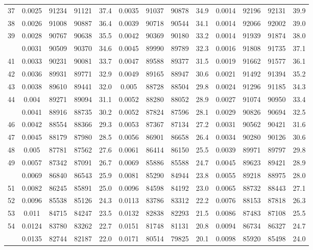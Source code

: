 \documentclass[
  14pt,
]{article}
\begin{document}
\begin{longtable}[t]{lcccccccccccc}
37 & 0.0025 & 91234 & 91121 & 37.4 & 0.0035 & 91037 & 90878 & 34.9 & 0.0014 & 92196 & 92131 & 39.9\\
38 & 0.0026 & 91008 & 90887 & 36.4 & 0.0039 & 90718 & 90544 & 34.1 & 0.0014 & 92066 & 92002 & 39.0\\
39 & 0.0028 & 90767 & 90638 & 35.5 & 0.0042 & 90369 & 90180 & 33.2 & 0.0014 & 91939 & 91874 & 38.0\\
\addlinespace
40 & 0.0031 & 90509 & 90370 & 34.6 & 0.0045 & 89990 & 89789 & 32.3 & 0.0016 & 91808 & 91735 & 37.1\\
41 & 0.0033 & 90231 & 90081 & 33.7 & 0.0047 & 89588 & 89377 & 31.5 & 0.0019 & 91662 & 91577 & 36.1\\
42 & 0.0036 & 89931 & 89771 & 32.9 & 0.0049 & 89165 & 88947 & 30.6 & 0.0021 & 91492 & 91394 & 35.2\\
43 & 0.0038 & 89610 & 89441 & 32.0 & 0.005 & 88728 & 88504 & 29.8 & 0.0024 & 91296 & 91185 & 34.3\\
44 & 0.004 & 89271 & 89094 & 31.1 & 0.0052 & 88280 & 88052 & 28.9 & 0.0027 & 91074 & 90950 & 33.4\\
\addlinespace
45 & 0.0041 & 88916 & 88735 & 30.2 & 0.0052 & 87824 & 87596 & 28.1 & 0.0029 & 90826 & 90694 & 32.5\\
46 & 0.0042 & 88554 & 88366 & 29.3 & 0.0053 & 87367 & 87134 & 27.2 & 0.0031 & 90562 & 90421 & 31.6\\
47 & 0.0045 & 88179 & 87980 & 28.5 & 0.0056 & 86901 & 86658 & 26.4 & 0.0034 & 90280 & 90126 & 30.6\\
48 & 0.005 & 87781 & 87562 & 27.6 & 0.0061 & 86414 & 86150 & 25.5 & 0.0039 & 89971 & 89797 & 29.8\\
49 & 0.0057 & 87342 & 87091 & 26.7 & 0.0069 & 85886 & 85588 & 24.7 & 0.0045 & 89623 & 89421 & 28.9\\
\addlinespace
50 & 0.0069 & 86840 & 86543 & 25.9 & 0.0081 & 85290 & 84944 & 23.8 & 0.0055 & 89218 & 88975 & 28.0\\
51 & 0.0082 & 86245 & 85891 & 25.0 & 0.0096 & 84598 & 84192 & 23.0 & 0.0065 & 88732 & 88443 & 27.1\\
52 & 0.0096 & 85538 & 85126 & 24.3 & 0.0113 & 83786 & 83312 & 22.2 & 0.0076 & 88153 & 87818 & 26.3\\
53 & 0.011 & 84715 & 84247 & 23.5 & 0.0132 & 82838 & 82293 & 21.5 & 0.0086 & 87483 & 87108 & 25.5\\
54 & 0.0124 & 83780 & 83262 & 22.7 & 0.0151 & 81748 & 81131 & 20.8 & 0.0094 & 86734 & 86327 & 24.7\\
\addlinespace
55 & 0.0135 & 82744 & 82187 & 22.0 & 0.0171 & 80514 & 79825 & 20.1 & 0.0098 & 85920 & 85498 & 24.0\\

\end{longtable}
\end{document}
